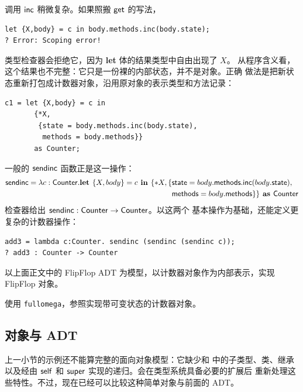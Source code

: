 调用 \(\mathsf{inc}\) 稍微复杂。如果照搬 \(\mathsf{get}\) 的写法，
\begin{lstlisting}
let {X,body} = c in body.methods.inc(body.state);
? Error: Scoping error!
\end{lstlisting}
类型检查器会拒绝它，因为 \textbf{let} 体的结果类型中自由出现了 \(X\)。
从程序含义看，这个结果也不完整：它只是一份裸的内部状态，并不是对象。正确
做法是把新状态重新打包成计数器对象，沿用原对象的表示类型和方法记录：
\begin{lstlisting}
c1 = let {X,body} = c in
       {*X,
        {state = body.methods.inc(body.state),
         methods = body.methods}}
       as Counter;
\end{lstlisting}
一般的 \(\mathsf{sendinc}\) 函数正是这一操作：
\[
\begin{aligned}
\mathsf{sendinc}
=\lambda c:\mathsf{Counter}.
\textbf{let }\{X,body\}=c\textbf{ in }
\{*X,\{&
\mathsf{state}=
body.\mathsf{methods}.\mathsf{inc}(body.\mathsf{state}),\\
&\mathsf{methods}=body.\mathsf{methods}\}\}
\textbf{ as }\mathsf{Counter}
\end{aligned}
\]
检查器给出
\(\mathsf{sendinc}:\mathsf{Counter}\to\mathsf{Counter}\)。以这两个
基本操作为基础，还能定义更复杂的计数器操作：
\begin{lstlisting}
add3 = lambda c:Counter. sendinc (sendinc (sendinc c));
? add3 : Counter -> Counter
\end{lstlisting}

\begin{exercise}
\label{ex:24.2.3}
以上面正文中的 FlipFlop ADT 为模型，以计数器对象作为内部表示，实现
FlipFlop 对象。
\end{exercise}

\begin{exercise}
\label{ex:24.2.4}
使用 \texttt{fullomega}，参照实现带可变状态的计数器对象。
\end{exercise}

\subsection*{对象与 ADT}

上一小节的示例还不能算完整的面向对象模型：它缺少和
中的子类型、类、继承以及经由 \(\mathsf{self}\) 和
\(\mathsf{super}\) 实现的递归。会在类型系统具备必要的扩展后
重新处理这些特性。不过，现在已经可以比较这种简单对象与前面的 ADT。


